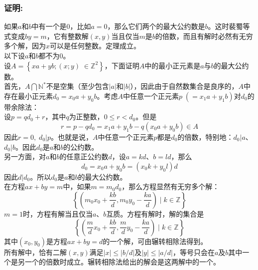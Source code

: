 \documentclass[UTF8]{ctexart}
\begin{document}
\subsubsection*{证明:}
如果$a$和$b$中有一个是$0$，比如$a = 0$，那么它们两个的最大公约数是$b$。这时裴蜀等式变成$by = m$，它有整数解$(x,y)$当且仅当$m$是$b$的倍数，而且有解时必然有无穷多个解，因为$x$可以是任何整数。定理成立。\\
以下设$a$和$b$都不为$0$。\\
设$A = \left\{xa + yb;(x;y)\;\in \mathbb{Z}^2\right\}$，下面证明$A$中的最小正元素是$a$与$b$的最大公约数。\\
首先，$A \bigcap \mathbb{N}^*$不是空集（至少包含$|a|$和$|b|$），因此由于自然数集合是良序的，$A$中存在最小正元素$d_0 = x_0a + y_0b$。考虑$A$中任意一个正元素$p\;(= x_1a + y_1b)$对$d_0$的带余除法：\\
设$p = qd_0 + r$，其中$q$为正整数，$0 \leq r < d_0$。但是
\[ r = p - qd_0 = x_1a + y_1b - q(x_0a + y_0b) \in A \]
因此$r = 0,\;d_0 | p$。也就是说，$A$中任意一个正元素$p$都是$d_0$的倍数，特别地：$d_0|a$、$d_0|b$。因此$d_0$是$a$和$b$的公约数。\\
另一方面，对$a$和$b$的任意正公约数$d$，设$a = kd$、$b = ld$，那么
\[ d_0 = x_0a + y_0b = (x_0k + y_0l)d \]
因此$d|d_0$。所以$d_0$是$a$和$b$的最大公约数。\\
在方程$ax + by = m$中，如果$m = m_0d_0$，那么方程显然有无穷多个解：
\[ \left\{(m_0x_0 + \frac {kb} d,m_0y_0 - \frac {ka} d)\;|\;k \in \mathbb{Z}\right\} \]
$m = 1$时，方程有解当且仅当$a$、$b$互质。方程有解时，解的集合是
\[ \left\{(\frac m dx_0 + \frac {kb} d,\frac m dy_0 - \frac {ka} d)\;|\;k \in \mathbb{Z}\right\} \]
其中$(x_0,y_0)$是方程$ax + by = d$的一个解，可由辗转相除法得到。\\
所有解中，恰有二解$(x,y)$满足$|x| \leq |b/d|$及$|y| \leq |a/d|$，等号只会在$a$及$b$其中一个是另一个的倍数时成立。辗转相除法给出的解会是这两解中的一个。
\clearpage
\printbibliography
\end{document}
